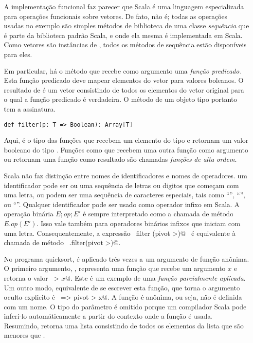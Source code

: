 A implementa\c{c}\~{a}o funcional faz parecer que Scala \'{e} uma linguagem
especializada para opera\c{c}\~{o}es funcionais sobre vetores. De fato, n\~{a}o \'{e};
todas as opera\c{c}\~{o}es usadas no exemplo s\~{a}o simples m\'{e}todos de biblioteca
de uma classe {\em sequ\^{e}ncia}  que \'{e} parte da biblioteca
padr\~{a}o Scala, e onde ela mesma \'{e} implementada em Scala. Como vetores s\~{a}o 
inst\^{a}ncias de \verb@Seq@, todos os m\'{e}todos de sequ\^{e}ncia est\~{a}o dispon\'{i}veis
para eles.

Em particular, h\'{a} o m\'{e}todo  que recebe como argumento uma
{\em fun\c{c}\~{a}o predicado}. Esta fun\c{c}\~{a}o predicado deve mapear elementos do 
vetor para valores boleanos. O resultado de  \'{e} um vetor
consistindo de todos os elementos do vetor original para o qual a fun\c{c}\~{a}o
predicado \'{e} verdadeira. O m\'{e}todo  de um objeto tipo
 portanto tem a assinatura. 


\begin{lstlisting}
def filter(p: T => Boolean): Array[T]
\end{lstlisting}

Aqui,  \'{e} o tipo das fun\c{c}\~{o}es que recebem um elemento 
do tipo  e retornam um valor booleano do tipo . 
Fun\c{c}\~{o}es como  
que recebem uma outra fun\c{c}\~{a}o como argumento ou retornam uma fun\c{c}\~{a}o como
resultado s\~{a}o chamadas {\em fun\c{c}\~{o}es de alta ordem.}     

Scala n\~{a}o faz distin\c{c}\~{a}o entre nomes de identificadores e nomes de operadores.
um identificador pode ser ou uma sequ\^{e}ncia de letras ou digitos que come\c{c}am
com uma letra, ou podem ser uma sequ\^{e}ncia de caracteres especiais, tais como 
``\code{+}'', ``\code{*}'', ou ``\code{:}''.  Qualquer identificador pode
ser usado como operador infixo em Scala. A opera\c{c}\~{a}o bin\'{a}ria $E;op;E'$ \'{e} sempre
interpretado como a chamada de m\'{e}todo $E.op(E')$. Isso vale tamb\'{e}m para 
operadores bin\'{a}rios infixos que iniciam com uma letra. Consequentemente,
a express\~{a}o  ~\lstinline@xs filter (pivot >)@~ \'{e} equivalente à chamada de
m\'{e}todo ~\lstinline@xs.filter(pivot >)@.



No programa quicksort,  \'{e} aplicado tr\^{e}s vezes a um argumento 
de fun\c{c}\~{a}o an\^{o}nima. O primeiro argumento, , representa uma 
fun\c{c}\~{a}o que recebe um argumento $x$ e retorna o valor ~\lstinline@pivot > $x$@.
Este \'{e} um exemplo de uma {\em fun\c{c}\~{a}o parcialmente aplicada}. Um outro modo, 
equivalente de se escrever esta fun\c{c}\~{a}o, que torna o argumento oculto explicito
\'{e} ~\lstinline@x => pivot > x@. A fun\c{c}\~{a}o \'{e} an\^{o}nima, ou seja, n\~{a}o \'{e} definida
com um nome. O tipo do par\^{a}metro   \'{e} omitido porque um compilador Scala 
pode infer\'{i}-lo autom\'{a}ticamente a partir do contexto onde a fun\c{c}\~{a}o \'{e} usada.
Resumindo,  retorna uma lista consistindo de todos os 
elementos da lista  que s\~{a}o menores que .  

